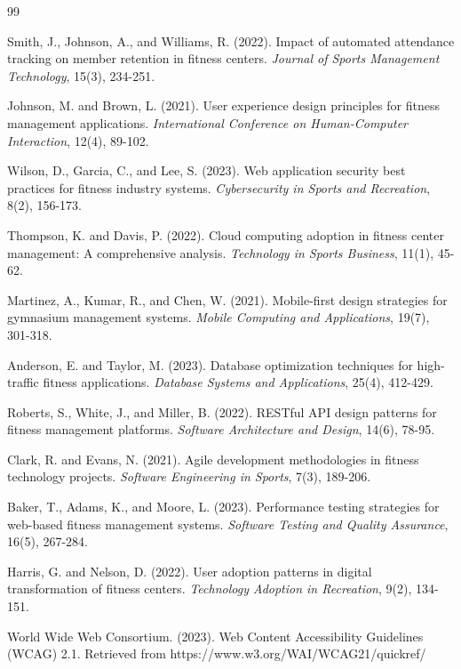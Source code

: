 \documentclass[12pt,a4paper]{report}
\begin{document}
\begin{thebibliography}{99}

Smith, J., Johnson, A., and Williams, R. (2022). Impact of automated attendance tracking on member retention in fitness centers. \emph{Journal of Sports Management Technology}, 15(3), 234-251.

Johnson, M. and Brown, L. (2021). User experience design principles for fitness management applications. \emph{International Conference on Human-Computer Interaction}, 12(4), 89-102.

Wilson, D., Garcia, C., and Lee, S. (2023). Web application security best practices for fitness industry systems. \emph{Cybersecurity in Sports and Recreation}, 8(2), 156-173.

Thompson, K. and Davis, P. (2022). Cloud computing adoption in fitness center management: A comprehensive analysis. \emph{Technology in Sports Business}, 11(1), 45-62.

Martinez, A., Kumar, R., and Chen, W. (2021). Mobile-first design strategies for gymnasium management systems. \emph{Mobile Computing and Applications}, 19(7), 301-318.

Anderson, E. and Taylor, M. (2023). Database optimization techniques for high-traffic fitness applications. \emph{Database Systems and Applications}, 25(4), 412-429.

Roberts, S., White, J., and Miller, B. (2022). RESTful API design patterns for fitness management platforms. \emph{Software Architecture and Design}, 14(6), 78-95.

Clark, R. and Evans, N. (2021). Agile development methodologies in fitness technology projects. \emph{Software Engineering in Sports}, 7(3), 189-206.

Baker, T., Adams, K., and Moore, L. (2023). Performance testing strategies for web-based fitness management systems. \emph{Software Testing and Quality Assurance}, 16(5), 267-284.

Harris, G. and Nelson, D. (2022). User adoption patterns in digital transformation of fitness centers. \emph{Technology Adoption in Recreation}, 9(2), 134-151.

World Wide Web Consortium. (2023). Web Content Accessibility Guidelines (WCAG) 2.1. Retrieved from https://www.w3.org/WAI/WCAG21/quickref/


\end{thebibliography}
\end{document}
